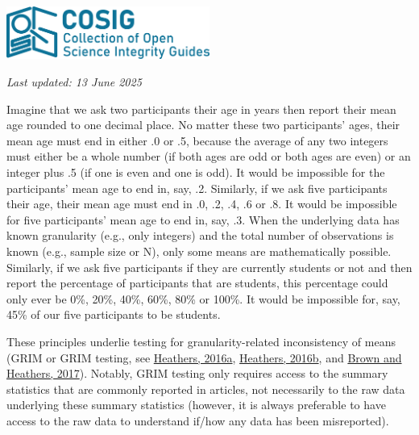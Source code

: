 \documentclass[letterpaper, 12pt]{article}
\begin{document}
\flushleft\includegraphics[width=0.5\textwidth]{img/home/241017_final_logo_mockup.png}

\textit{Last updated: 13 June 2025}


Imagine that we ask two participants their age in years then report their mean age rounded to one decimal place. No matter these two participants' ages, their mean age must end in either .0 or .5, because the average of any two integers must either be a whole number (if both ages are odd or both ages are even) or an integer plus .5 (if one is even and one is odd). It would be impossible for the participants' mean age to end in, say, .2. Similarly, if we ask five participants their age, their mean age must end in .0, .2, .4, .6 or .8. It would be impossible for five participants' mean age to end in, say, .3. When the underlying data has known granularity (e.g., only integers) and the total number of observations is known (e.g., sample size or N), only some means are mathematically possible. Similarly, if we ask five participants if they are currently students or not and then report the percentage of participants that are students, this percentage could only ever be 0\%, 20\%, 40\%, 60\%, 80\% or 100\%. It would be impossible for, say, 45\% of our five participants to be students.

These principles underlie testing for granularity-related inconsistency of means (GRIM or GRIM testing, see \href{https://jamesheathers.medium.com/the-grim-test-a-method-for-evaluating-published-research-9a4e5f05e870}{Heathers, 2016a}, \href{https://jamesheathers.medium.com/the-grim-test-further-points-follow-ups-and-future-directions-afd55ff67bb0#.vmgjvdvkf}{Heathers, 2016b}, and \href{https://doi.org/10.1177/1948550616673876}{Brown and Heathers, 2017}). Notably, GRIM testing only requires access to the summary statistics that are commonly reported in articles, not necessarily to the raw data underlying these summary statistics (however, it is always preferable to have access to the raw data to understand if/how any data has been misreported).
\end{document}
